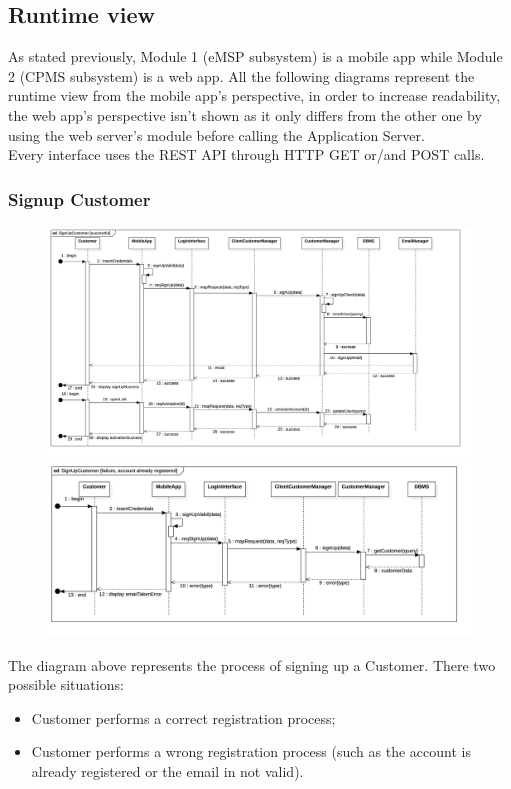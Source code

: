 \subsection{Runtime view}
As stated previously, Module 1 (eMSP subsystem) is a mobile app while Module 2 (CPMS subsystem) is a web app. All the following diagrams represent the runtime view from the mobile app’s perspective, in order to increase readability, the web app’s perspective isn’t shown as it only differs from the other one by using the web server’s module before calling the Application Server.\\
Every interface uses the REST API through HTTP GET or/and POST calls.
\subsubsection{Signup Customer}
\begin{figure}[H]
    \begin{center}
        \includegraphics[width=\textwidth]{img/runtime/cust_signup_success}
        \includegraphics[width=\textwidth]{img/runtime/cust_signup_error}
    \end{center}
\end{figure}
The diagram above represents the process of signing up a Customer. There two possible situations:
\begin{itemize}
    \item Customer performs a correct registration process;
    \item Customer performs a wrong registration process (such as the account is already registered or the email in not valid).
\end{itemize}
